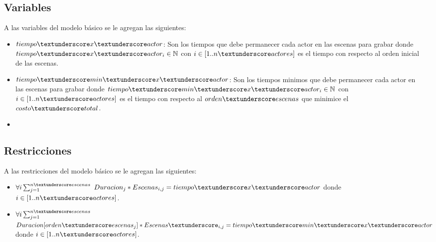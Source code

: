 \documentclass{article}
\begin{document}
\subsection{Variables}
A las variables del modelo básico se le agregan las siguientes:
\begin{itemize}
    \item $tiempo\textunderscore x\textunderscore actor$: Son los tiempos que debe permanecer cada actor en las escenas para grabar donde $tiempo\textunderscore  x\textunderscore actor_i \in \mathbb{N}$ con $i \in [1..n\textunderscore actores]$ es el tiempo con respecto al orden inicial de las escenas.
    \item $tiempo\textunderscore min\textunderscore x\textunderscore actor$: Son los tiempos minimos que debe permanecer cada actor en las escenas para grabar donde $tiempo\textunderscore min\textunderscore x\textunderscore actor_i \in \mathbb{N}$ con $i \in [1..n\textunderscore actores]$ es el tiempo con respecto al $orden\textunderscore escenas$ que minimice el $costo\textunderscore total$.
    \item 
\end{itemize}

\subsection{Restricciones}
A las restricciones del modelo básico se le agregan las siguientes:
\begin{itemize}
    \item $\forall i\sum_{j=1}^{n\textunderscore escenas}$  $Duracion_j * Escenas_{i,j} = tiempo\textunderscore x\textunderscore actor$\newline
          donde $i \in [1..n\textunderscore actores]$.
    \item $\forall i\sum_{j=1}^{n\textunderscore escenas}$  $Duracion[orden\textunderscore escenas_j] * Escenas\textunderscore_{i,j} = tiempo\textunderscore min\textunderscore x\textunderscore actor$\newline
          donde $i \in [1..n\textunderscore actores]$.
\end{itemize}
\end{document}
